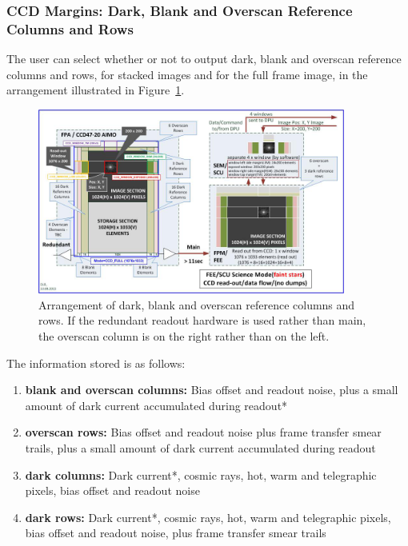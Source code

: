 \documentclass[11pt]{article}      %
\def\HCode#1{}
\def\htmlanchor#1{\HCode{<a id="#1"></a>}}
\begin{document}
\clearpage

\htmlanchor{ccdMargins}
\subsubsection{CCD Margins: Dark, Blank and Overscan Reference Columns and Rows}
\label{sec:ccdMargins}

The user can select whether or not to output dark, blank and overscan reference columns and rows, for stacked images and for the full frame image, in the arrangement illustrated in Figure~\ref{fig:ccdMargins}.

\begin{figure}[hbtp]
  \begin{center}
    \includegraphics[width=0.9\textwidth]{CCD-Read-out-V2-150810DW.png}
    \caption{Arrangement of dark, blank and overscan reference columns and rows. If the redundant readout hardware is used rather than main, the overscan column is on the right rather than on the left.}
    \label{fig:ccdMargins}
  \end{center}
\end{figure}

The information stored is as follows:
\begin{enumerate}
\item {\bf blank and overscan columns:} Bias offset and readout noise, plus a small amount of dark current accumulated during readout*
\item {\bf overscan rows:} Bias offset and readout noise plus frame transfer smear trails, plus a small amount of dark current accumulated during readout
\item {\bf dark columns:} Dark current*, cosmic rays, hot, warm and telegraphic pixels, bias offset and readout noise
\item {\bf dark rows:} Dark current*, cosmic rays, hot, warm and telegraphic pixels, bias offset and readout noise, plus frame transfer smear trails
\end{enumerate}
\end{document}
